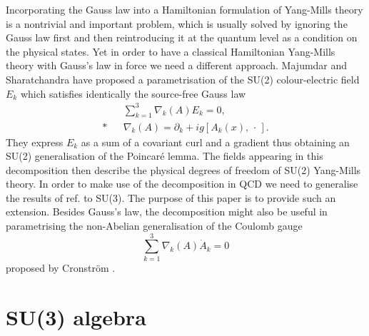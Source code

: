 \documentclass[a4paper,12pt]{article}
\begin{document}
Incorporating the Gauss law into a Hamiltonian formulation of Yang-Mills theory
is a nontrivial and important problem, which is usually solved by ignoring the
Gauss law first and then reintroducing it at the quantum level as a condition on the physical states. Yet in order to have a classical Hamiltonian Yang-Mills theory with Gauss's law in force we need a different approach. Majumdar and Sharatchandra have proposed a
parametrisation of the SU(2) colour-electric field $E_k$ which satisfies identically the
source-free Gauss law \cite{ms1}
\begin{eqnarray}
&& \sum_{k=1}^3 \nabla_k(A) E_k = 0, \label{gsf} \\*
&& \nabla_k (A) = \partial_k + ig [A_k (x),\, \cdot \, ].\nonumber
\end{eqnarray}
They express $E_k$ as a sum of a covariant curl and a
gradient thus obtaining an SU(2) generalisation of the Poincar\'e lemma. The
fields appearing in this decomposition then describe the physical degrees of
freedom of SU(2) Yang-Mills theory. In order to make use of the decomposition
in QCD we need to generalise the results of ref. \cite{ms1} to SU(3). The purpose of this 
paper is to provide such an extension. Besides Gauss's law, the decomposition might
also be useful in parametrising the non-Abelian generalisation of the Coulomb gauge
$$ \sum_{k=1}^3 \nabla_k(A) \dot{A}_k = 0 $$
proposed by Cronstr\"om \cite{cc}.

\section{SU(3) algebra}
\end{document}
